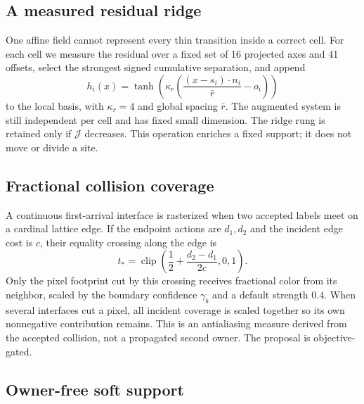 \documentclass[11pt,letterpaper]{article}
\begin{document}
\subsection{A measured residual ridge}

One affine field cannot represent every thin transition inside a correct cell. For each
cell we measure the residual over a fixed set of 16 projected axes and 41 offsets,
select the strongest signed cumulative separation, and append
\begin{equation}
h_i(x)=\tanh\!\left(\kappa_r
\left(\frac{(x-s_i)\cdot n_i}{\bar r}-o_i\right)\right)
\end{equation}
to the local basis, with \(\kappa_r=4\) and global spacing \(\bar r\). The augmented
system is still independent per cell and has fixed small dimension. The ridge rung is
retained only if \(\mathcal J\) decreases. This operation enriches a fixed support; it
does not move or divide a site.

\subsection{Fractional collision coverage}

A continuous first-arrival interface is rasterized when two accepted labels meet on a
cardinal lattice edge. If the endpoint actions are \(d_1,d_2\) and the incident edge
cost is \(c\), their equality crossing along the edge is
\begin{equation}
t_*=\operatorname{clip}\left(\frac12+\frac{d_2-d_1}{2c},0,1\right).
\label{eq:crossing}
\end{equation}
Only the pixel footprint cut by this crossing receives fractional color from its
neighbor, scaled by the boundary confidence \(\gamma_b\) and a default strength \(0.4\).
When several interfaces cut a pixel, all incident coverage is scaled together so its
own nonnegative contribution remains. This is an antialiasing measure derived from the
accepted collision, not a propagated second owner. The proposal is objective-gated.

\subsection{Owner-free soft support}
\end{document}
